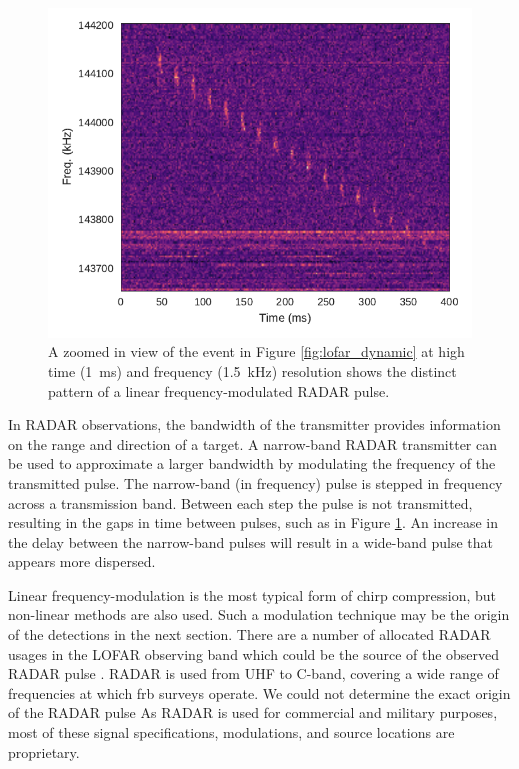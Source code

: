 \documentclass[a4paper,fleqn,usenatbib]{mnras}
\begin{document}
\begin{figure}
    \includegraphics[width=1.0\linewidth]{figures/LOFAR_dynamic_high_res.pdf}
    \caption{A zoomed in view of the event in Figure \ref{fig:lofar_dynamic} at
    high time (1~ms) and frequency (1.5~kHz) resolution shows the distinct
    pattern of a linear frequency-modulated RADAR pulse.
    }
    \label{fig:lofar_dynamic_high}
\end{figure}

In RADAR observations, the bandwidth of the transmitter provides information on
the range and direction of a target. A narrow-band RADAR transmitter can be used
to approximate a larger bandwidth by modulating the frequency of the transmitted
pulse. The narrow-band (in frequency) pulse is stepped in frequency across a
transmission band. Between each step the pulse is not transmitted, resulting in
the gaps in time between pulses, such as in Figure \ref{fig:lofar_dynamic_high}.
An increase in the delay between the narrow-band pulses will result in a
wide-band pulse that appears more dispersed.

Linear frequency-modulation is the most typical form of chirp compression, but
non-linear methods are also used. Such a modulation technique may be the origin
of the detections in the next section.  There are a number of allocated RADAR
usages in the LOFAR observing band which could be the source of the observed
RADAR pulse \citep{ofcom2017}.  RADAR is used from UHF to C-band, covering a
wide range of frequencies at which \gls{frb} surveys operate. We could not
determine the exact origin of the RADAR pulse As RADAR is used for commercial
and military purposes, most of these signal specifications, modulations, and
source locations are proprietary.
\end{document}
